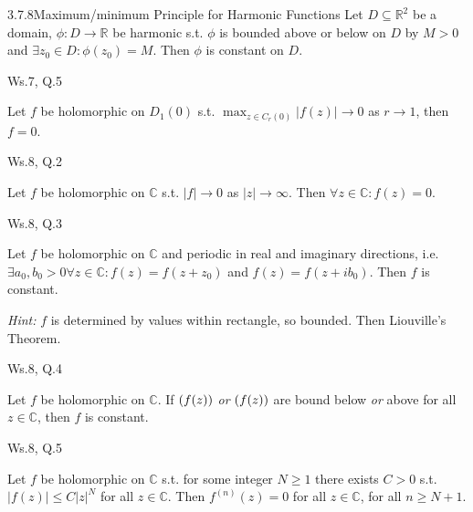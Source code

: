 \documentclass[10pt,landscape]{article}
\renewcommand{\leq}{\leqslant}
\renewcommand{\geq}{\geqslant}
\let\Re\relax
\DeclareMathOperator{\Re}{Re}
\let\Im\relax
\DeclareMathOperator{\Im}{Im}
\newcommand{\Hint}{\textit{Hint: }}
\begin{document}
\begin{multicols}{3}
\begin{theorem}{3.7.8}{Maximum/minimum Principle for Harmonic Functions}
    Let $D \subseteq \mathbb{R}^2$ be a domain, $\phi: D \to \mathbb{R}$ be harmonic s.t. $\phi$ is bounded above or below on $D$ by $M > 0$ and $\exists z_0 \in D: \phi(z_0) = M$. Then $\phi$ is constant on $D$.

\end{theorem}

\begin{question}{Ws.7, Q.5}{}

    Let $f$ be holomorphic on $D_1(0)$ s.t. $\max_{z \in C_r(0)}{|f(z)|} \to 0$ as $r \to 1$, then $f = 0$.

\end{question}

\begin{question}{Ws.8, Q.2}{}

    Let $f$ be holomorphic on $\mathbb{C}$ s.t. $|f| \to 0$ as $|z| \to \infty$. Then $\forall z \in \mathbb{C}: f(z) = 0$.

\end{question}

\begin{question}{Ws.8, Q.3}{}

    Let $f$ be holomorphic on $\mathbb{C}$ and periodic in real and imaginary directions, i.e. $\exists a_0,b_0 > 0 \forall z \in \mathbb{C}: f(z) = f(z + z_0)$ and $f(z) = f(z + ib_0)$. Then $f$ is constant.

    \Hint $f$ is determined by values within rectangle, so bounded. Then Liouville's Theorem.

\end{question}

\begin{question}{Ws.8, Q.4}{}

    Let $f$ be holomorphic on $\mathbb{C}$. If $\Re(f(z))$ \emph{or} $\Im(f(z))$ are bound below \emph{or} above for all $z \in \mathbb{C}$, then $f$ is constant.

\end{question}

\begin{question}{Ws.8, Q.5}{}

    Let $f$ be holomorphic on $\mathbb{C}$ s.t. for some integer $N \geq 1$ there exists $C > 0$ s.t. $|f(z)| \leq C|z|^N$ for all $z \in \mathbb{C}$. Then $f^(n)(z) = 0$ for all $z \in \mathbb{C}$, for all $n \geq N + 1$.


\end{question}
\end{multicols}
\end{document}
